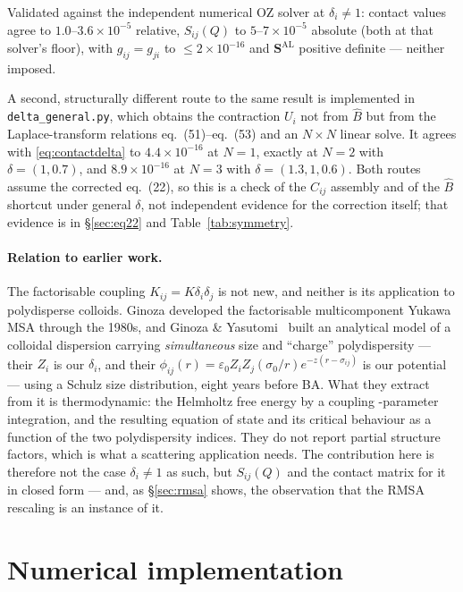 \documentclass[11pt,a4paper]{article}
\newcommand{\Shat}{\bm{S}}
\newcommand{\eqBH}[1]{eq.~(#1)}
\newcommand{\code}[1]{\texttt{#1}}
\begin{document}
Validated against the independent numerical OZ solver at $\delta_i\neq1$:
contact values agree to $1.0$--$3.6\times10^{-5}$ relative, $S_{ij}(Q)$ to
$5$--$7\times10^{-5}$ absolute (both at that solver's floor), with
$g_{ij}=g_{ji}$ to $\le2\times10^{-16}$ and $\Shat^{\mathrm{AL}}$ positive
definite --- neither imposed.

A second, structurally different route to the same result is implemented in
\code{delta\_general.py}, which obtains the contraction $U_i$ not from $\hat B$
but from the Laplace-transform relations \eqBH{51}--\eqBH{53} and an
$N\times N$ linear solve. It agrees with \eqref{eq:contactdelta} to
$4.4\times10^{-16}$ at $N=1$, exactly at $N=2$ with $\delta=(1,0.7)$, and
$8.9\times10^{-16}$ at $N=3$ with $\delta=(1.3,1,0.6)$. Both routes assume the
corrected \eqBH{22}, so this is a check of the $C_{ij}$ assembly and of the
$\hat B$ shortcut under general $\delta$, not independent evidence for the
correction itself; that evidence is in \S\ref{sec:eq22} and
Table~\ref{tab:symmetry}.

\paragraph{Relation to earlier work.} The factorisable coupling
$K_{ij}=K\delta_i\delta_j$ is not new, and neither is its application to
polydisperse colloids. Ginoza developed the factorisable multicomponent Yukawa
MSA through the 1980s, and Ginoza \& Yasutomi~\cite{GinozaYasutomi1998} built
an analytical model of a colloidal dispersion carrying \emph{simultaneous} size
and ``charge'' polydispersity --- their $Z_i$ is our $\delta_i$, and their
$\phi_{ij}(r)=\varepsilon_0Z_iZ_j(\sigma_0/r)e^{-z(r-\sigma_{ij})}$ is our
potential --- using a Schulz size distribution, eight years before BA. What
they extract from it is thermodynamic: the Helmholtz free energy by a coupling
-parameter integration, and the resulting equation of state and its critical
behaviour as a function of the two polydispersity indices. They do not report
partial structure factors, which is what a scattering application needs. The
contribution here is therefore not the case $\delta_i\neq1$ as such, but
$S_{ij}(Q)$ and the contact matrix for it in closed form --- and, as
\S\ref{sec:rmsa} shows, the observation that the RMSA rescaling is an instance
of it.

\section{Numerical implementation}
\end{document}
